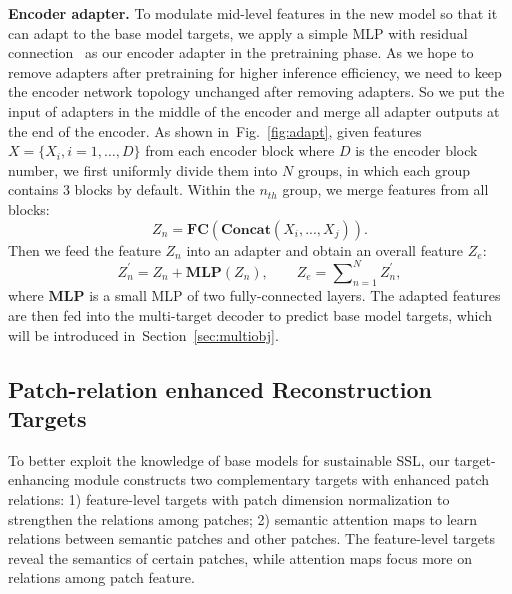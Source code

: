 \documentclass{article} \usepackage{iclr2023_conference,times}
\def\figref#1{figure~\ref{#1}}
\def\secref#1{section~\ref{#1}}
\newcommand{\myPara}[1]{\vspace{-.05in} \noindent\textbf{#1}}
\renewcommand{\figref}[1]{Fig.~\ref{#1}}\newcommand{\tabref}[1]{Tab.~\ref{#1}}\renewcommand{\secref}[1]{Section~\ref{#1}}
\begin{document}
 
\myPara{Encoder adapter.}
To modulate mid-level features in the new model so that it can adapt to the base model targets, we apply a simple MLP with residual connection~\citep{chen2022adaptformer} as our encoder adapter in the  pretraining phase. 
As we hope to remove adapters after pretraining for higher inference efficiency,
we need to keep the encoder network topology unchanged after removing adapters. 
So we put the input of adapters in the middle of the encoder and merge all adapter outputs at the end of the encoder. 
As shown in~\figref{fig:adapt}, given features $X = \{X_{i}, i =  1, \ldots, D \}$ from each encoder block where $D$ is the encoder block number, we first uniformly divide them into $N$ groups, in which  each group contains 3 blocks by default. 
Within the $n_{th}$ group, we merge features from all blocks: 
\begin{equation*}
	Z_{n} = \mathbf{FC}(\mathbf{Concat}(X_i, ..., X_j)). 
\end{equation*}
Then we feed the feature $Z_{n}$ into an adapter and obtain an overall feature $Z_{e}$:  
\begin{equation}\label{targets}
	Z_{n}^{'}=Z_{n} + \mathbf{MLP}(Z_{n}), \qquad Z_{e} = \sum\nolimits_{n=1}^{N}{Z_{n}^{'}},
\end{equation}
where $\mathbf{MLP}$ is a small MLP of two fully-connected layers.	
The adapted features are then fed into the multi-target decoder to predict base model targets,  which will be introduced in~\secref{sec:multiobj}.


 
\vspace{-10pt}
\subsection{Patch-relation enhanced Reconstruction Targets}
\vspace{-5pt}
\label{sec:multiobj}
To better exploit the knowledge of base models for sustainable SSL, our target-enhancing module constructs two complementary targets with enhanced patch relations: 1) feature-level targets 
with patch dimension normalization to strengthen the relations among patches; 2) semantic 
attention maps to learn relations between semantic patches and other patches. The feature-level
targets reveal the semantics of certain patches, while attention maps focus more on  relations among patch feature.
\end{document}
